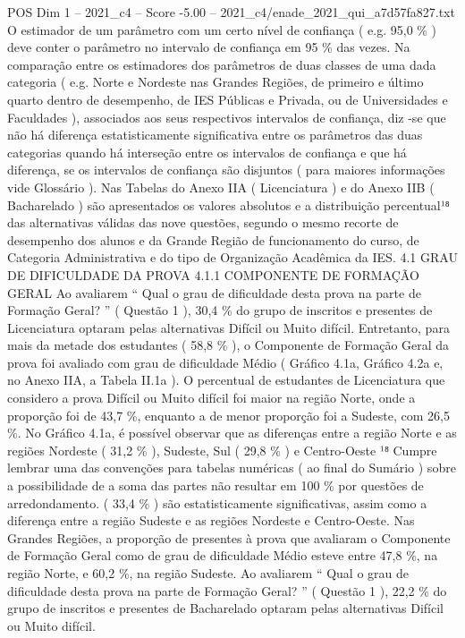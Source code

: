 \begin{textsample}{POS Dim 1 – 2021\_c4 – Score -5.00 – 2021\_c4/enade\_2021\_qui\_a7d57fa827.txt}
O estimador de um parâmetro com um certo nível de confiança ( e.g. 95,0 \% ) deve conter o parâmetro no intervalo de confiança em 95 \% das vezes.
Na comparação entre os estimadores dos parâmetros de duas classes de uma dada categoria ( e.g.
Norte e Nordeste nas Grandes Regiões, de primeiro e último quarto dentro de desempenho, de IES Públicas e Privada, ou de Universidades e Faculdades ), associados aos seus respectivos intervalos de confiança, diz -se que não há diferença estatisticamente significativa entre os parâmetros das duas categorias quando há interseção entre os intervalos de confiança e que há diferença, se os intervalos de confiança são disjuntos ( para maiores informações vide Glossário ).
Nas Tabelas do Anexo IIA ( Licenciatura ) e do Anexo IIB ( Bacharelado ) são apresentados os valores absolutos e a distribuição percentual¹⁸ das alternativas válidas das nove questões, segundo o mesmo recorte de desempenho dos alunos e da Grande Região de funcionamento do curso, de Categoria Administrativa e do tipo de Organização Acadêmica da IES. 4.1 GRAU DE DIFICULDADE DA PROVA 4.1.1 COMPONENTE DE FORMAÇÃO GERAL Ao avaliarem “ Qual o grau de dificuldade desta prova na parte de Formação Geral? ” ( Questão 1 ), 30,4 \% do grupo de inscritos e presentes de Licenciatura optaram pelas alternativas Difícil ou Muito difícil.
Entretanto, para mais da metade dos estudantes ( 58,8 \% ), o Componente de Formação Geral da prova foi avaliado com grau de dificuldade Médio ( Gráfico 4.1a, Gráfico 4.2a e, no Anexo IIA, a Tabela II.1a ).
O percentual de estudantes de Licenciatura que considero a prova Difícil ou Muito difícil foi maior na região Norte, onde a proporção foi de 43,7 \%, enquanto a de menor proporção foi a Sudeste, com 26,5 \%.
No Gráfico 4.1a, é possível observar que as diferenças entre a região Norte e as regiões Nordeste ( 31,2 \% ), Sudeste, Sul ( 29,8 \% ) e Centro-Oeste ¹⁸ Cumpre lembrar uma das convenções para tabelas numéricas ( ao final do Sumário ) sobre a possibilidade de a soma das partes não resultar em 100 \% por questões de arredondamento. ( 33,4 \% ) são estatisticamente significativas, assim como a diferença entre a região Sudeste e as regiões Nordeste e Centro-Oeste.
Nas Grandes Regiões, a proporção de presentes à prova que avaliaram o Componente de Formação Geral como de grau de dificuldade Médio esteve entre 47,8 \%, na região Norte, e 60,2 \%, na região Sudeste.
Ao avaliarem “ Qual o grau de dificuldade desta prova na parte de Formação Geral? ” ( Questão 1 ), 22,2 \% do grupo de inscritos e presentes de Bacharelado optaram pelas alternativas Difícil ou Muito difícil.

\end{textsample}
